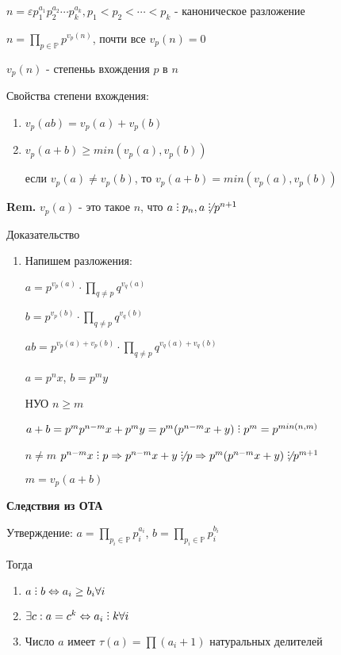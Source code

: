 \documentclass[14pt, letter paper]{article}
\def\divby{%
  \mathrel{\text{\vbox{\baselineskip.65ex\lineskiplimit0pt\hbox{.}\hbox{.}\hbox{.}}}}%
}
\begin{document}
$n = \varepsilon p_1^{a_1} p_2^{a_2} \cdots p_k^{a_k}, p_1 < p_2 < \cdots < p_k$ - каноническое разложение

$n = \prod\limits_{p \in \mathds{P}} p^{v_p(n)}$, почти все $v_p(n) = 0$

$v_p(n)$ - степеньь вхождения $p$ в $n$

Свойства степени вхождения:

\begin{enumerate}
    \item $v_p(ab) = v_p(a) + v_p(b)$
    \item $v_p(a + b) \geq min(v_p(a), v_p(b))$

    если $v_p(a) \neq v_p(b)$, то $v_p(a+b) = min(v_p(a), v_p(b))$
\end{enumerate}

\textbf{Rem.} $v_p(a)$ - это такое $n$, что $a \divby p_n, a \not\divby p^{n+1}$

\begin{center}
    Доказательство
\end{center}

\begin{enumerate}
    \item Напишем разложения:

    $a = p^{v_p(a)} \cdot \prod\limits_{q \neq p} q^{v_q(a)}$

    $b = p^{v_p(b)} \cdot \prod\limits_{q \neq p} q^{v_q(b)}$

    $ab = p^{v_p(a) + v_p(b)} \cdot \prod\limits_{q \neq p} q^{v_q(a) + v_q(b)}$

    $a = p^n x$, $b = p^m y$

    НУО $n \geq m$

    $a + b = p^m p^{n-m} x + p^m y = p^m (p^{n-m} x + y) \divby p^m = p^{min(n, m)}$

    $n \neq m$ $p^{n-m} x \divby p \Rightarrow p^{n-m} x + y \not\divby p \Rightarrow p^m(p^{n-m} x + y) \not\divby p^{m+1}$

    $m = v_p(a+b)$
\end{enumerate}

\textbf{Следствия из ОТА}

Утверждение: $a = \prod\limits_{p_i \in \mathds{P}} p_i^{a_i}$, $b = \prod\limits_{p_i \in \mathds{P}} p_i^{b_i}$

Тогда 

\begin{enumerate}
    \item $a \divby b \Leftrightarrow a_i \geq b_i \forall i$
    \item $\exists c : a = c^k \Leftrightarrow a_i \divby k \forall i$
    \item Число $a$ имеет $\tau (a) = \prod (a_i + 1)$ натуральных делителей
\end{enumerate}
\end{document}
